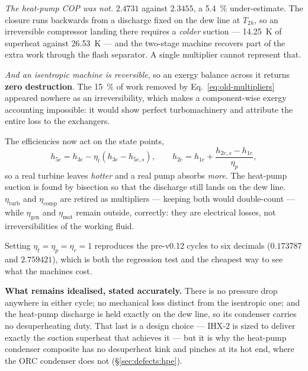 \emph{The heat-pump COP was not.} $2.4731$ against $2.3455$, a
\SI{5.4}{\percent} under-estimate. The closure runs backwards from a discharge
fixed on the dew line at $T_{2h}$, so an irreversible compressor landing there
requires a \emph{colder} suction --- \SI{14.25}{\kelvin} of superheat against
\SI{26.53}{\kelvin} --- and the two-stage machine recovers part of the extra
work through the flash separator. A single multiplier cannot represent that.

\emph{And an isentropic machine is reversible}, so an exergy balance across it
returns \textbf{zero destruction}. The \SI{15}{\percent} of work removed by
Eq.~\eqref{eq:old-multipliers} appeared nowhere as an irreversibility, which
makes a component-wise exergy accounting impossible: it would show perfect
turbomachinery and attribute the entire loss to the exchangers.

The efficiencies now act on the state points,
\begin{equation}
  h_{5e} = h_{3e} - \eta_{t}\left(h_{3e}-h_{5e,s}\right),
  \qquad
  h_{2e} = h_{1e} + \frac{h_{2e,s}-h_{1e}}{\eta_{p}},
  \label{eq:isentropic-eff}
\end{equation}
so a real turbine leaves \emph{hotter} and a real pump absorbs \emph{more}. The
heat-pump suction is found by bisection so that the discharge still lands on the
dew line. $\eta_{\mathrm{turb}}$ and $\eta_{\mathrm{comp}}$ are retired as
multipliers --- keeping both would double-count --- while $\eta_{\mathrm{gen}}$
and $\eta_{\mathrm{mot}}$ remain outside, correctly: they are electrical losses,
not irreversibilities of the working fluid.

Setting $\eta_{t}=\eta_{p}=\eta_{c}=1$ reproduces the pre-v0.12 cycles to six
decimals ($0.173787$ and $2.759421$), which is both the regression test and the
cheapest way to see what the machines cost.

\medskip
\noindent\textbf{What remains idealised, stated accurately.} There is no
pressure drop anywhere in either cycle; no mechanical loss distinct from the
isentropic one; and the heat-pump discharge is held exactly on the dew line, so
its condenser carries no desuperheating duty. That last is a design choice ---
IHX-2 is sized to deliver exactly the suction superheat that achieves it --- but
it is why the heat-pump condenser composite has no desuperheat kink and pinches
at its hot end, where the ORC condenser does not (\S\ref{sec:defects:hpe}).

